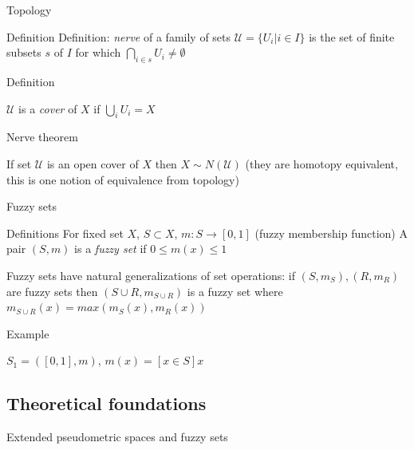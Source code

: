 \documentclass[unknownkeysallowed]{beamer}
\begin{document}
\begin{frame}{Topology}

	\begin{block}{Definition}
	Definition: \textit{nerve} of a family of sets $\mathcal{U} = \{U_i| i \in I \}$ is the set of finite subsets $s$ of $I$ for which $\bigcap_{i \in s} U_i \neq \emptyset$
	\end{block}

	\begin{block}{Definition}

	$\mathcal{U}$ is a \textit{cover} of $X$ if $\bigcup_i U_i = X$
	\end{block}

	\begin{block}{Nerve theorem}

	If set $\mathcal{U}$ is an open cover of $X$  then $X \sim N(\mathcal{U})$ (they are homotopy equivalent, this is one notion of equivalence from topology)

	\end{block}
\end{frame}

\begin{frame}{Fuzzy sets}

    \begin{block}{Definitions}
    For fixed set $X$, $S \subset X$, $m: S \to [0, 1]$ (fuzzy membership function)
    \break
    A pair $(S, m)$ is a \textit{fuzzy set} if $0 \leq m(x) \leq 1$

    Fuzzy sets have natural generalizations of set operations: 
    \break
    if $(S, m_S), (R, m_R)$ are fuzzy sets then 
    \break
    $(S \cup R, m_{S \cup R})$ is a fuzzy set
    \break
    where
    \break
    $m_{S \cup R}(x) = max(m_S(x), m_R(x))$
    \end{block}

    \begin{exampleblock}{Example}

    $S_1 = ([0, 1], m)$, $m(x) = [x \in S] x$

    \end{exampleblock}

\end{frame}

\subsection{Theoretical foundations}
\begin{frame}{Extended pseudometric spaces and fuzzy sets}


\end{frame}
\end{document}
